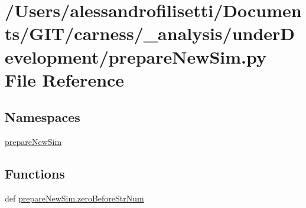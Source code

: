 \hypertarget{a00059}{\section{/\-Users/alessandrofilisetti/\-Documents/\-G\-I\-T/carness/\-\_\-analysis/under\-Development/prepare\-New\-Sim.py File Reference}
\label{a00059}
}
\subsection*{Namespaces}
\begin{DoxyCompactItemize}
\item 
\hyperlink{a00119}{prepare\-New\-Sim}
\end{DoxyCompactItemize}
\subsection*{Functions}
\begin{DoxyCompactItemize}
\item 
def \hyperlink{a00119_a6b14bf9916da5f148ec52646dd61250d}{prepare\-New\-Sim.\-zero\-Before\-Str\-Num}
\end{DoxyCompactItemize}
